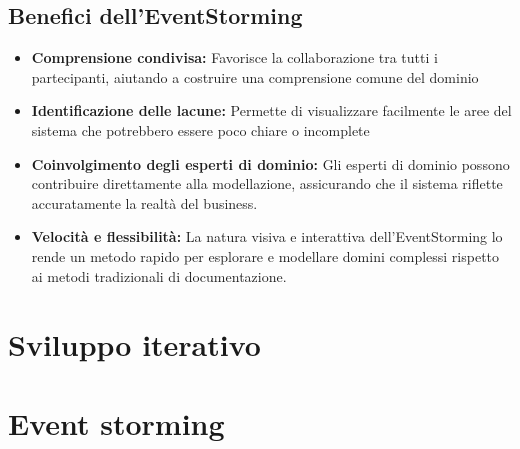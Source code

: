 \subsection{Benefici dell'EventStorming}
\begin{itemize}
    \item \textbf{Comprensione condivisa:} Favorisce la collaborazione tra tutti i partecipanti, aiutando a costruire una comprensione comune del dominio
    \item \textbf{Identificazione delle lacune:} Permette di visualizzare facilmente le aree del sistema che potrebbero essere poco chiare o incomplete
    \item \textbf{Coinvolgimento degli esperti di dominio:} Gli esperti di dominio possono contribuire direttamente alla modellazione, assicurando che il sistema riflette accuratamente la realtà del business.
    \item \textbf{Velocità e flessibilità:} La natura visiva e interattiva dell'EventStorming lo rende un metodo rapido per esplorare e modellare domini complessi rispetto ai metodi tradizionali di documentazione.
\end{itemize}

\section{Sviluppo iterativo}
\label{sec:sviluppo-iterativo}

\section{Event storming}
\label{sec:event-storming}





